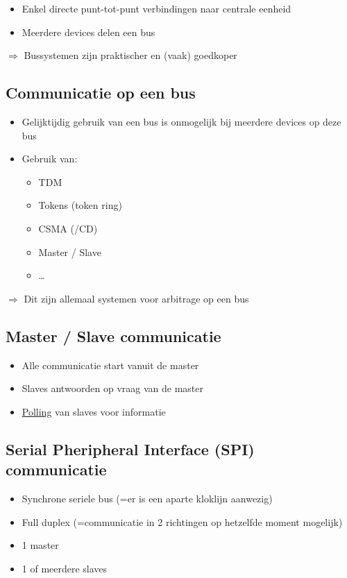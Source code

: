 \documentclass{article}
\begin{document}
\begin{itemize}
    \item Enkel directe punt-tot-punt verbindingen naar centrale eenheid
    \item Meerdere devices delen een bus
\end{itemize}

$\Rightarrow$ Bussystemen zijn praktischer en (vaak) goedkoper

\subsection{Communicatie op een bus}
\begin{itemize}
    \item Gelijktijdig gebruik van een bus is onmogelijk bij meerdere devices op deze bus
    \item Gebruik van:
    \begin{itemize}
        \item TDM
        \item Tokens (token ring)
        \item CSMA (/CD)
        \item Master / Slave
        \item \dots
    \end{itemize}
\end{itemize}

$\Rightarrow$ Dit zijn allemaal systemen voor arbitrage op een bus

\subsection{Master / Slave communicatie}
\begin{itemize}
    \item Alle communicatie start vanuit de master
    \item Slaves antwoorden op vraag van de master
    \item \underline{Polling} van slaves voor informatie
\end{itemize}

\subsection{Serial Pheripheral Interface (SPI) communicatie}
\begin{itemize}
    \item Synchrone seriele bus (=er is een aparte kloklijn aanwezig)
    \item Full duplex (=communicatie in 2 richtingen op hetzelfde moment mogelijk)
    \item 1 master
    \item 1 of meerdere slaves
\end{itemize}
\end{document}

